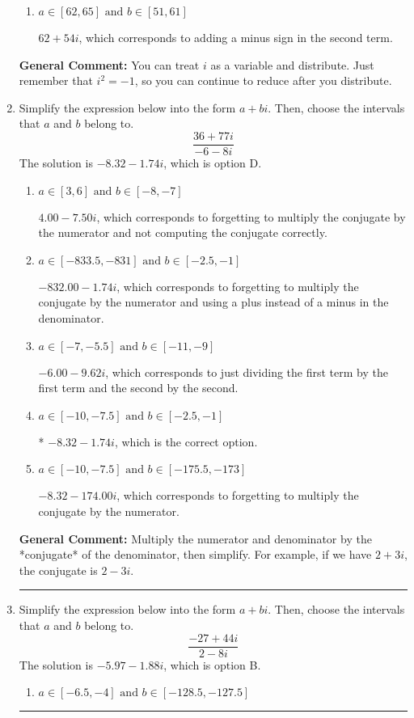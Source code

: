 \documentclass{extbook}[14pt]
\newcommand{\litem}[1]{\item #1

\rule{\textwidth}{0.4pt}}
\begin{document}
\begin{enumerate}
{\begin{enumerate}[label=\Alph*.]
 $-78 + 26 i$, which corresponds to adding a minus sign in both terms.
\item \( a \in [62, 65] \text{ and } b \in [51, 61] \)

 $62 + 54 i$, which corresponds to adding a minus sign in the second term.
\end{enumerate}

\textbf{General Comment:} You can treat $i$ as a variable and distribute. Just remember that $i^2=-1$, so you can continue to reduce after you distribute.
}
\litem{
Simplify the expression below into the form $a+bi$. Then, choose the intervals that $a$ and $b$ belong to.
\[ \frac{36 + 77 i}{-6 - 8 i} \]The solution is \( -8.32  - 1.74 i \), which is option D.\begin{enumerate}[label=\Alph*.]
\item \( a \in [3, 6] \text{ and } b \in [-8, -7] \)

 $4.00  - 7.50 i$, which corresponds to forgetting to multiply the conjugate by the numerator and not computing the conjugate correctly.
\item \( a \in [-833.5, -831] \text{ and } b \in [-2.5, -1] \)

 $-832.00  - 1.74 i$, which corresponds to forgetting to multiply the conjugate by the numerator and using a plus instead of a minus in the denominator.
\item \( a \in [-7, -5.5] \text{ and } b \in [-11, -9] \)

 $-6.00  - 9.62 i$, which corresponds to just dividing the first term by the first term and the second by the second.
\item \( a \in [-10, -7.5] \text{ and } b \in [-2.5, -1] \)

* $-8.32  - 1.74 i$, which is the correct option.
\item \( a \in [-10, -7.5] \text{ and } b \in [-175.5, -173] \)

 $-8.32  - 174.00 i$, which corresponds to forgetting to multiply the conjugate by the numerator.
\end{enumerate}

\textbf{General Comment:} Multiply the numerator and denominator by the *conjugate* of the denominator, then simplify. For example, if we have $2+3i$, the conjugate is $2-3i$.
}
\litem{
Simplify the expression below into the form $a+bi$. Then, choose the intervals that $a$ and $b$ belong to.
\[ \frac{-27 + 44 i}{2 - 8 i} \]The solution is \( -5.97  - 1.88 i \), which is option B.\begin{enumerate}[label=\Alph*.]
\item \( a \in [-6.5, -4] \text{ and } b \in [-128.5, -127.5] \)


\end{enumerate}}
\end{enumerate}
\end{document}
